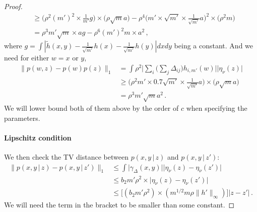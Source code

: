 \documentclass{article}
\theoremstyle{definition}
\theoremstyle{definition}
\theoremstyle{definition}
\theoremstyle{definition}
\theoremstyle{definition}
\theoremstyle{definition}
\theoremstyle{remark}
\theoremstyle{remark}
\newcommand{\given}{\,|\,}
\begin{document}
\begin{proof}
\begin{align*}
        & \ge \Big(\rho^2 (m')^2 \times  \frac{1}{m'} g\Big) \times \Big(\rho\sqrt{m} a\Big) - \rho^4\Big(m'\times \sqrt{m'}\times \frac{1}{\sqrt{m'}}a\Big)^2 \times \Big(\rho^2 m\Big) \\
        & = \rho^3 m'\sqrt{m} \times ag - \rho^6 (m')^2m\times a^2\,,
    \end{align*}
    where $g=\int |\widetilde{h}(x,y) - \frac{1}{\sqrt{m'}}h(x) - \frac{1}{\sqrt{m'}} h(y)|dxdy$ being a constant. And we need for either $w=x$ or $y$,
    \begin{align*}
        \| p(w, z) - p(w)p(z)\|_1 & =  \int \rho^2\Big| \sum_i \Big(\sum_j\Delta_{ij}\Big)h_{i,m'}(w) \Big| \Big| \eta_\nu(z) \Big|  \\
        & \ge \Big( \rho^2 m'\times 0.7\sqrt{m'}\times \frac{1}{\sqrt{m'}} a\Big) \times \Big(\rho \sqrt{m} a\Big) \\
        & = \rho^3 m'\sqrt{m} a^2\,.
    \end{align*}
    We will lower bound both of them above by the order of $c$ when specifying the parameters.

    \paragraph{Lipschitz condition}
    We then check the TV distance between $p(x,y\given z)$ and $p(x,y\given z')$:
    \begin{align*}
        \| p(x,y\given z) - p(x,y\given z') \|_1 & \le  \int \Big|\gamma_{\Delta}(x, y) \Big| \Big|\eta_\nu(z) - \eta_\nu(z')\Big| \\
         & \le b_2 m'\rho^2 \times  \Big|\eta_\nu(z) - \eta_\nu(z')\Big| \\
         & \le \bigg[(b_2 m'\rho^2) \times (m^{1/2}m\rho\|h'\|_{\infty})\bigg]|z-z'| \,.
    \end{align*}
    We will need the term in the bracket to be smaller than some constant.


\end{proof}
\end{document}
